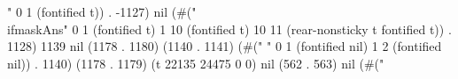 " 0 1 (fontified t)) . -1127) nil (#(" \\ifmaskAns" 0 1 (fontified t) 1 10 (fontified t) 10 11 (rear-nonsticky t fontified t)) . 1128) 1139 nil (1178 . 1180) (1140 . 1141) (#("  " 0 1 (fontified nil) 1 2 (fontified nil)) . 1140) (1178 . 1179) (t 22135 24475 0 0) nil (562 . 563) nil (#("%
